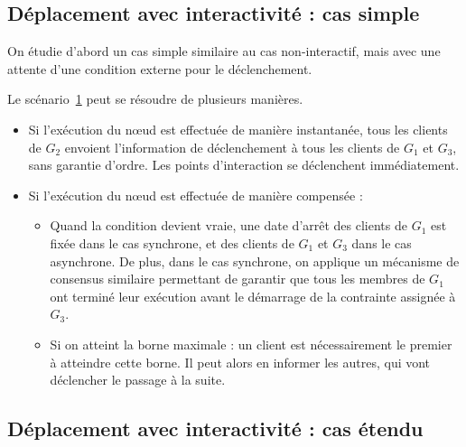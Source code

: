 \documentclass[10pt]{article}
\newcommand\triggers{points d'interaction\xspace}
\begin{document}
\subsection{Déplacement avec interactivité : cas simple}
On étudie d'abord un cas simple similaire au cas non-interactif, mais avec une attente d'une condition externe pour le déclenchement.

\begin{figure}[h]
	\centering
	\begin{tikzpicture}
	
	\end{tikzpicture}
	\label{scenar.trigger-1}
\end{figure}

Le scénario~\ref{scenar.trigger-1} peut se résoudre de plusieurs manières.

\begin{itemize}
	\item Si l'exécution du nœud est effectuée de manière instantanée, tous les clients de $G_2$ envoient l'information de déclenchement à tous les clients de $G_1$ et $G_3$, sans garantie d'ordre.
	Les \triggers se déclenchent immédiatement.
	
	
	\item Si l'exécution du nœud est effectuée de manière compensée : 
	\begin{itemize}
		\item Quand la condition devient vraie, une date d'arrêt des clients de $G_1$ est fixée dans le cas synchrone, et des clients de $G_1$ et $G_3$ dans le cas asynchrone. 
		De plus, dans le cas synchrone, on applique un mécanisme de consensus similaire permettant de garantir que tous les membres de $G_1$ ont terminé leur exécution avant le démarrage de la contrainte assignée à $G_3$.
		\item Si on atteint la borne maximale : un client est nécessairement le premier à atteindre cette borne.
		Il peut alors en informer les autres, qui vont déclencher le passage à la suite.
	\end{itemize}
\end{itemize}

\subsection{Déplacement avec interactivité : cas étendu}
\end{document}
